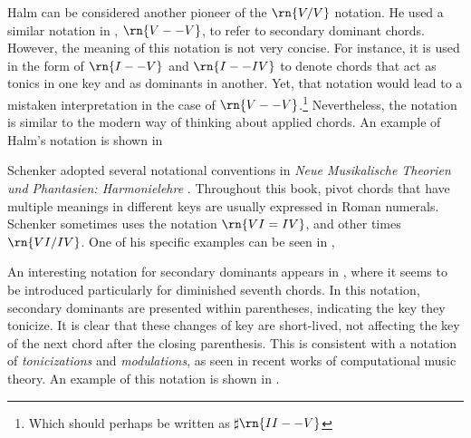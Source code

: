 Halm can be considered another pioneer of the $\rn{V/V}$
notation. He used a similar notation in
\textcite{halm1900harmonielehre}, $\rn{V--V}$, to refer to
secondary dominant chords. However, the meaning of this
notation is not very concise. For instance, it is used in
the form of $\rn{I--V}$ and $\rn{I--IV}$ to denote chords
that act as tonics in one key and as dominants in another.
Yet, that notation would lead to a mistaken interpretation
in the case of $\rn{V--V}$.\footnote{Which should perhaps be
written as $\sharp{}\rn{II--V}$} Nevertheless, the notation
is similar to the modern way of thinking about applied
chords. An example of Halm's notation is shown in


Schenker adopted several notational conventions in
\emph{Neue Musikalische Theorien und Phantasien:
Harmonielehre} \parencite{schenker1906neue}. Throughout this
book, pivot chords that have multiple meanings in different
keys are usually expressed in Roman numerals. Schenker
sometimes uses the notation $\rn{VI=IV}$, and other times
$\rn{VI/IV}$. One of his specific examples can be seen in
,




An interesting notation for secondary dominants appears in
\textcite{white1911harmonic}, where it seems to be
introduced particularly for diminished seventh chords. In
this notation, secondary dominants are presented within
parentheses, indicating the key they tonicize. It is clear
that these changes of key are short-lived, not affecting the
key of the next chord after the closing parenthesis. This is
consistent with a notation of \emph{tonicizations} and
\emph{modulations}, as seen in recent works of computational
music theory. An example of this notation is shown in
.


